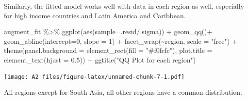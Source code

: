 \documentclass[
]{article}
\newenvironment{Shaded}{\begin{snugshade}}{\end{snugshade}}
\newcommand{\AttributeTok}[1]{\textcolor[rgb]{0.77,0.63,0.00}{#1}}
\newcommand{\DecValTok}[1]{\textcolor[rgb]{0.00,0.00,0.81}{#1}}
\newcommand{\FloatTok}[1]{\textcolor[rgb]{0.00,0.00,0.81}{#1}}
\newcommand{\FunctionTok}[1]{\textcolor[rgb]{0.00,0.00,0.00}{#1}}
\newcommand{\NormalTok}[1]{#1}
\newcommand{\SpecialCharTok}[1]{\textcolor[rgb]{0.00,0.00,0.00}{#1}}
\newcommand{\StringTok}[1]{\textcolor[rgb]{0.31,0.60,0.02}{#1}}
\begin{document}
Similarly, the fitted model works well with data in each region as well,
especially for high income countries and Latin America and Caribbean.

\begin{Shaded}
\begin{Highlighting}[]
\NormalTok{augment\_fit }\SpecialCharTok{\%\textgreater{}\%} 
  \FunctionTok{ggplot}\NormalTok{(}\FunctionTok{aes}\NormalTok{(}\AttributeTok{sample=}\NormalTok{.resid}\SpecialCharTok{/}\NormalTok{.sigma)) }\SpecialCharTok{+}
  \FunctionTok{geom\_qq}\NormalTok{()}\SpecialCharTok{+}
  \FunctionTok{geom\_abline}\NormalTok{(}\AttributeTok{intercept=}\DecValTok{0}\NormalTok{, }\AttributeTok{slope =} \DecValTok{1}\NormalTok{) }\SpecialCharTok{+}
  \FunctionTok{facet\_wrap}\NormalTok{(}\SpecialCharTok{\textasciitilde{}}\NormalTok{region, }\AttributeTok{scale =} \StringTok{"free"}\NormalTok{) }\SpecialCharTok{+}
  \FunctionTok{theme}\NormalTok{(}\AttributeTok{panel.background =} \FunctionTok{element\_rect}\NormalTok{(}\AttributeTok{fill =} \StringTok{"\#f0fcfc"}\NormalTok{),}
        \AttributeTok{plot.title =} \FunctionTok{element\_text}\NormalTok{(}\AttributeTok{hjust =} \FloatTok{0.5}\NormalTok{)) }\SpecialCharTok{+}
  \FunctionTok{ggtitle}\NormalTok{(}\StringTok{"QQ Plot for each region"}\NormalTok{)}
\end{Highlighting}
\end{Shaded}

\texttt{[image: A2\_files/figure-latex/unnamed-chunk-7-1.pdf]}

All regions except for South Asia, all other regions have a common
distribution.
\end{document}
